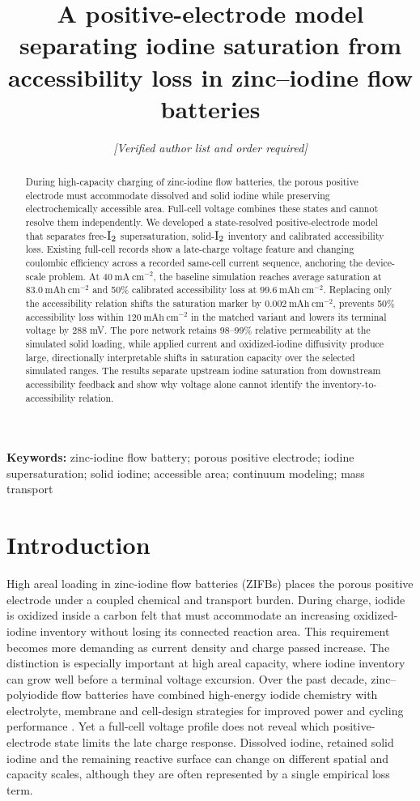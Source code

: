 \documentclass[11pt]{article}
\title{\bfseries A positive-electrode model separating iodine saturation from accessibility loss in zinc--iodine flow batteries}
\author{\textit{[Verified author list and order required]}}
\affil{\textit{[Verified affiliations and corresponding-author details required]}}
\date{}
\begin{document}
\maketitle

\begin{abstract}
During high-capacity charging of zinc-iodine flow batteries, the porous positive electrode must accommodate dissolved and solid iodine while preserving electrochemically accessible area. Full-cell voltage combines these states and cannot resolve them independently. We developed a state-resolved positive-electrode model that separates free-$\ce{I2}$ supersaturation, solid-$\ce{I2}$ inventory and calibrated accessibility loss. Existing full-cell records show a late-charge voltage feature and changing coulombic efficiency across a recorded same-cell current sequence, anchoring the device-scale problem. At $40~\mathrm{mA~cm^{-2}}$, the baseline simulation reaches average saturation at $83.0~\mathrm{mAh~cm^{-2}}$ and 50\% calibrated accessibility loss at $99.6~\mathrm{mAh~cm^{-2}}$. Replacing only the accessibility relation shifts the saturation marker by $0.002~\mathrm{mAh~cm^{-2}}$, prevents 50\% accessibility loss within $120~\mathrm{mAh~cm^{-2}}$ in the matched variant and lowers its terminal voltage by 288 mV. The pore network retains 98--99\% relative permeability at the simulated solid loading, while applied current and oxidized-iodine diffusivity produce large, directionally interpretable shifts in saturation capacity over the selected simulated ranges. The results separate upstream iodine saturation from downstream accessibility feedback and show why voltage alone cannot identify the inventory-to-accessibility relation.
\end{abstract}

\noindent\textbf{Keywords:} zinc-iodine flow battery; porous positive electrode; iodine supersaturation; solid iodine; accessible area; continuum modeling; mass transport

\section{Introduction}


High areal loading in zinc-iodine flow batteries (ZIFBs) places the porous positive electrode under a coupled chemical and transport burden. During charge, iodide is oxidized inside a carbon felt that must accommodate an increasing oxidized-iodine inventory without losing its connected reaction area. This requirement becomes more demanding as current density and charge passed increase. The distinction is especially important at high areal capacity, where iodine inventory can grow well before a terminal voltage excursion. Over the past decade, zinc--polyiodide flow batteries have combined high-energy iodide chemistry with electrolyte, membrane and cell-design strategies for improved power and cycling performance \citep{Li2015,Xie2018,Weng2017,Fan2024}. Yet a full-cell voltage profile does not reveal which positive-electrode state limits the late charge response. Dissolved iodine, retained solid iodine and the remaining reactive surface can change on different spatial and capacity scales, although they are often represented by a single empirical loss term.
\end{document}
